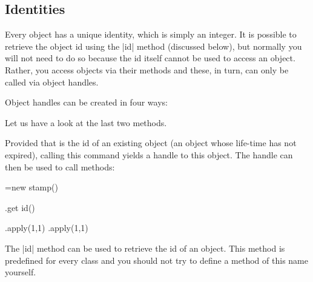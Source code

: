 \subsection{Identities}
\label{section-identities}

Every object has a unique identity, which is simply an integer. It is
possible to retrieve the object id using the |id| method (discussed
below), but normally you will not need to do so because the id itself
cannot be used to access an object. Rather, you access objects via
their methods and these, in turn, can only be called via object
handles. 

Object handles can be created in four ways:

Let us have a look at the last two methods.

\begin{command}{\pgfooobj{}}
  Provided that  is the id of an existing object (an object
  whose life-time has not expired), calling this command yields a
  handle to this object. The handle can then be used to call methods:
\begin{codeexample}
\pgfoonew \mystamp=new stamp()

\mystamp.get id(\myid)

\mystamp.apply(1,1)
\pgfooobj{\myid}.apply(1,1)
\end{codeexample}
\end{command}

The |id| method can be used to retrieve the id of an object. This
method is predefined for every class and you should not try to define
a method of this name yourself.


